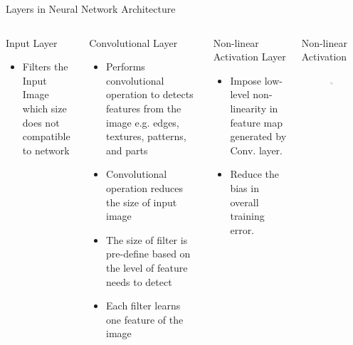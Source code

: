 \documentclass[10pt]{beamer}
\begin{document}
\begin{frame}{Layers in Neural Network Architecture}
    \begin{columns}
        \begin{block}{Input Layer}
         \begin{itemize}
             \item Filters the Input Image which size does not compatible to network
         \end{itemize}             
        \end{block}
        \vspace{-5pt}
        \begin{block}{Convolutional Layer}
         \begin{itemize}
             \item Performs convolutional operation to detects features from the image e.g. edges, textures, patterns, and parts
             \item Convolutional operation reduces the size of input image 
             \item The size of filter is pre-define based on the level of feature needs to detect
             \item Each filter learns one feature of the image
         \end{itemize}
        \end{block}

        \begin{block}{Non-linear Activation Layer}
            \begin{itemize}
               \item Impose low-level non-linearity in feature map generated by Conv. layer.
               \item Reduce the bias in overall training error. 
            \end{itemize} 
        \end{block} 
        
        \begin{example}{Non-linear Activation}
             \begin{figure}
                  \centering
                   \includegraphics[width=0.6\textwidth]{Images/activation.png}
            \end{figure}
        \end{example}
    \end{columns}
\end{frame}
\end{document}
